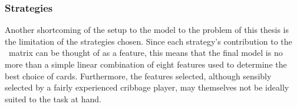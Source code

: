 
\subsubsection*{Strategies}
\label{sec:disc-shortcomings-strategies}


Another shortcoming of the setup to the model to the problem of this thesis is
the limitation of the strategies chosen.
%
Since each strategy's contribution to the \Smat\ matrix can be thought of as
a feature,
this means that the final model is no more than a simple linear combination of
eight features
used to determine the best choice of cards.
%
Furthermore,
the features selected,
although sensibly selected by a fairly experienced cribbage player,
may themselves not be ideally suited to the task at hand.

